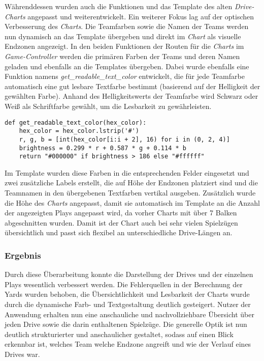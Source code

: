 Währenddessen wurden auch die Funktionen und das Template des alten \textit{Drive-Charts} angepasst und weiterentwickelt.
Ein weiterer Fokus lag auf der optischen Verbesserung des \textit{Charts}. Die Teamfarben sowie die Namen der Teams werden nun dynamisch an das Template übergeben und direkt im \textit{Chart} als visuelle Endzonen angezeigt. In den beiden Funktionen der Routen für die \textit{Charts} im \textit{Game-Controller} werden die primären Farben der Teams und deren Namen geladen und ebenfalls an die Templates übergeben. Dabei wurde ebenfalls eine Funktion namens \textit{get\_readable\_text\_color} entwickelt, die für jede Teamfarbe automatisch eine gut lesbare Textfarbe bestimmt (basierend auf der Helligkeit der gewählten Farbe). Anhand des Helligkeitswerts der Teamfarbe wird Schwarz oder Weiß als Schriftfarbe gewählt, um die Lesbarkeit zu gewährleisten. 

\vspace*{0.3cm}
\begin{verbatim}
def get_readable_text_color(hex_color):
    hex_color = hex_color.lstrip('#')
    r, g, b = [int(hex_color[i:i + 2], 16) for i in (0, 2, 4)]
    brightness = 0.299 * r + 0.587 * g + 0.114 * b
    return "#000000" if brightness > 186 else "#ffffff"
\end{verbatim}
\vspace*{0.3cm}
Im Template wurden diese Farben in die entsprechenden Felder eingesetzt und zwei zusätzliche Labels erstellt, die auf Höhe der Endzonen platziert sind und die Teamnamen in den übergebenen Textfarben vertikal ausgeben.
Zusätzlich wurde die Höhe des \textit{Charts} angepasst, damit sie automatisch im Template an die Anzahl der angezeigten Plays angepasst wird, da vorher Charts mit über 7 Balken abgeschnitten wurden. Damit ist der Chart auch bei sehr vielen Spielzügen übersichtlich und passt sich flexibel an unterschiedliche Drive-Längen an. 
\vspace*{0.5cm}
\subsubsection{Ergebnis}
\vspace*{0.5cm}
Durch diese Überarbeitung konnte die Darstellung der Drives und der einzelnen Plays wesentlich verbessert werden. Die Fehlerquellen in der Berechnung der Yards wurden behoben, die Übersichtlichkeit und Lesbarkeit der Charts wurde durch die dynamische Farb- und Textgestaltung deutlich gesteigert. Nutzer der Anwendung erhalten nun eine anschauliche und nachvollziehbare Übersicht über jeden Drive sowie die darin enthaltenen Spielzüge. Die generelle Optik ist nun deutlich strukturierter und anschaulicher gestaltet, sodass auf einen Blick erkennbar ist, welches Team welche Endzone angreift und wie der Verlauf eines Drives war.

